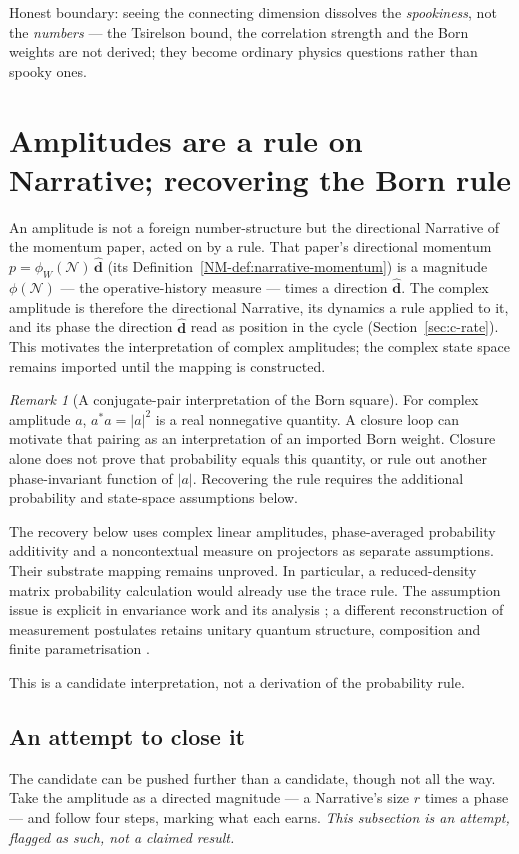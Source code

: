 \documentclass[11pt,a4paper]{article}
\theoremstyle{remark}\newtheorem{remark}[definition]{Remark}
\begin{document}
Honest boundary: seeing the connecting dimension dissolves the \emph{spookiness},
not the \emph{numbers} --- the Tsirelson bound, the correlation strength and the
Born weights are not derived; they become ordinary physics questions rather than
spooky ones.

\section{Amplitudes are a rule on Narrative; recovering the Born rule}\label{sec:amplitudes}
An amplitude is not a foreign number-structure but the directional Narrative of
the momentum paper, acted on by a rule. That paper's directional
momentum $p=\phi_W(\mathcal N)\,\hat{\mathbf d}$ (its
Definition~\ref{NM-def:narrative-momentum}) is a magnitude $\phi(\mathcal N)$
--- the operative-history measure --- times a direction $\hat{\mathbf d}$. The complex amplitude is
therefore the directional Narrative, its dynamics a rule applied to it, and its
phase the direction $\hat{\mathbf d}$ read as position in the cycle
(Section~\ref{sec:c-rate}). This motivates the interpretation of complex amplitudes; the complex state space remains imported until the mapping is constructed.

\begin{remark}[A conjugate-pair interpretation of the Born square]\label{prop:born}
For complex amplitude $a$, $a^*a=|a|^2$ is a real nonnegative quantity.
A closure loop can motivate that pairing as an interpretation of an imported
Born weight. Closure alone does not prove that probability equals this quantity,
or rule out another phase-invariant function of $|a|$. Recovering the rule
requires the additional probability and state-space assumptions below.
\end{remark}
The recovery below uses complex linear amplitudes, phase-averaged probability
additivity and a noncontextual measure on projectors as separate assumptions.
Their substrate mapping remains unproved. In particular, a reduced-density
matrix probability calculation would already use the trace rule. The
assumption issue is explicit in envariance work and its analysis
\citep{schlosshauerfine2005}; a different reconstruction of measurement postulates
retains unitary quantum structure, composition and finite parametrisation
\citep{masanes2019}.



This is a candidate interpretation, not a derivation of the probability rule.

\subsection{An attempt to close it}\label{sec:born-attempt}
The candidate can be pushed further than a candidate, though not all the way. Take
the amplitude as a directed magnitude --- a Narrative's size $r$ times a phase ---
and follow four steps, marking what each earns. \emph{This subsection is an attempt,
flagged as such, not a claimed result.}
\end{document}
